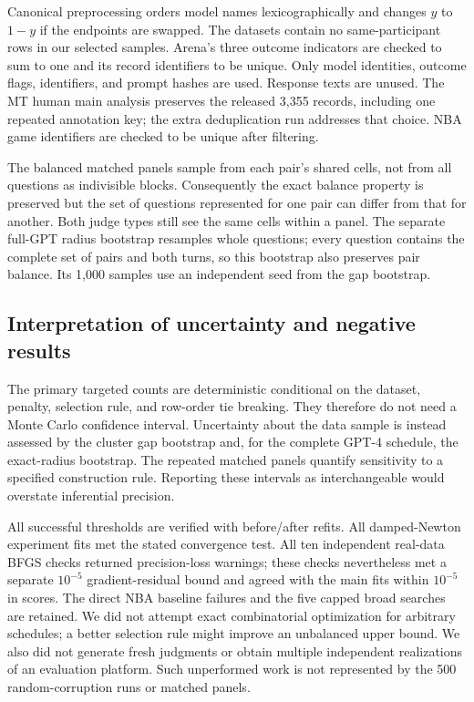 \documentclass{article}
\begin{document}
Canonical preprocessing orders model names lexicographically and changes $y$ to $1-y$ if the endpoints are swapped. The datasets contain no same-participant rows in our selected samples. Arena's three outcome indicators are checked to sum to one and its record identifiers to be unique. Only model identities, outcome flags, identifiers, and prompt hashes are used. Response texts are unused. The MT human main analysis preserves the released 3,355 records, including one repeated annotation key; the extra deduplication run addresses that choice. NBA game identifiers are checked to be unique after filtering.

The balanced matched panels sample from each pair's shared cells, not from all questions as indivisible blocks. Consequently the exact balance property is preserved but the set of questions represented for one pair can differ from that for another. Both judge types still see the same cells within a panel. The separate full-GPT radius bootstrap resamples whole questions; every question contains the complete set of pairs and both turns, so this bootstrap also preserves pair balance. Its 1,000 samples use an independent seed from the gap bootstrap.

\subsection{Interpretation of uncertainty and negative results}
The primary targeted counts are deterministic conditional on the dataset, penalty, selection rule, and row-order tie breaking. They therefore do not need a Monte Carlo confidence interval. Uncertainty about the data sample is instead assessed by the cluster gap bootstrap and, for the complete GPT-4 schedule, the exact-radius bootstrap. The repeated matched panels quantify sensitivity to a specified construction rule. Reporting these intervals as interchangeable would overstate inferential precision.

All successful thresholds are verified with before/after refits. All damped-Newton experiment fits met the stated convergence test. All ten independent real-data BFGS checks returned precision-loss warnings; these checks nevertheless met a separate $10^{-5}$ gradient-residual bound and agreed with the main fits within $10^{-5}$ in scores. The direct NBA baseline failures and the five capped broad searches are retained. We did not attempt exact combinatorial optimization for arbitrary schedules; a better selection rule might improve an unbalanced upper bound. We also did not generate fresh judgments or obtain multiple independent realizations of an evaluation platform. Such unperformed work is not represented by the 500 random-corruption runs or matched panels.
\end{document}
